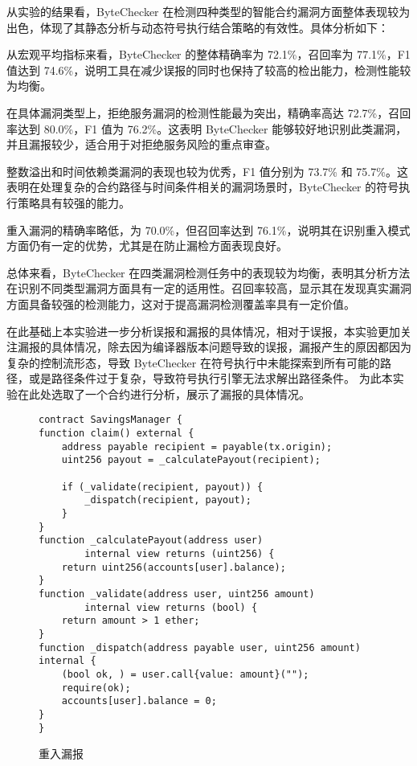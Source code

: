 \documentclass[print, master, vlined, timesmath]{DissertUESTC}
\begin{document}
    
从实验的结果看，ByteChecker 在检测四种类型的智能合约漏洞方面整体表现较为出色，体现了其静态分析与动态符号执行结合策略的有效性。具体分析如下：

从宏观平均指标来看，ByteChecker 的整体精确率为 72.1\%，召回率为 77.1\%，F1 值达到 74.6\%，说明工具在减少误报的同时也保持了较高的检出能力，检测性能较为均衡。

在具体漏洞类型上，拒绝服务漏洞的检测性能最为突出，精确率高达 72.7\%，召回率达到 80.0\%，F1 值为 76.2\%。这表明 ByteChecker 能够较好地识别此类漏洞，并且漏报较少，适合用于对拒绝服务风险的重点审查。

整数溢出和时间依赖类漏洞的表现也较为优秀，F1 值分别为 73.7\% 和 75.7\%。这表明在处理复杂的合约路径与时间条件相关的漏洞场景时，ByteChecker 的符号执行策略具有较强的能力。

重入漏洞的精确率略低，为 70.0\%，但召回率达到 76.1\%，说明其在识别重入模式方面仍有一定的优势，尤其是在防止漏检方面表现良好。

总体来看，ByteChecker 在四类漏洞检测任务中的表现较为均衡，表明其分析方法在识别不同类型漏洞方面具有一定的适用性。召回率较高，显示其在发现真实漏洞方面具备较强的检测能力，这对于提高漏洞检测覆盖率具有一定价值。

在此基础上本实验进一步分析误报和漏报的具体情况，相对于误报，本实验更加关注漏报的具体情况，除去因为编译器版本问题导致的误报，漏报产生的原因都因为复杂的控制流形态，导致 ByteChecker 在符号执行中未能探索到所有可能的路径，或是路径条件过于复杂，导致符号执行引擎无法求解出路径条件。 为此本实验在此处选取了一个合约进行分析，展示了漏报的具体情况。

\begin{figure}[H]
    \centering
    \begin{minipage}{0.9\textwidth}
    \begin{verbatim}
contract SavingsManager {
function claim() external {
    address payable recipient = payable(tx.origin);
    uint256 payout = _calculatePayout(recipient);

    if (_validate(recipient, payout)) {
        _dispatch(recipient, payout);
    }
}
function _calculatePayout(address user) 
        internal view returns (uint256) {
    return uint256(accounts[user].balance);
}
function _validate(address user, uint256 amount) 
        internal view returns (bool) {
    return amount > 1 ether; 
}
function _dispatch(address payable user, uint256 amount) internal {
    (bool ok, ) = user.call{value: amount}("");
    require(ok);
    accounts[user].balance = 0;
}
}
    \end{verbatim}
    \end{minipage}
    \caption{重入漏报}
    \label{fig:reentrancy_miss}
\end{figure}
\end{document}
